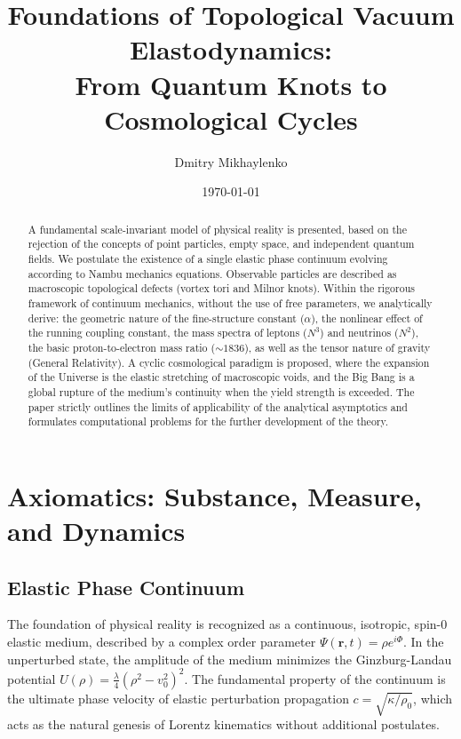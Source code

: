 \documentclass[12pt,a4paper]{article}
\title{\textbf{Foundations of Topological Vacuum Elastodynamics:\\ From Quantum Knots to Cosmological Cycles}}
\author{Dmitry Mikhaylenko}
\date{\today}
\begin{document}
\maketitle

\begin{abstract}
A fundamental scale-invariant model of physical reality is presented, based on the rejection of the concepts of point particles, empty space, and independent quantum fields. We postulate the existence of a single elastic phase continuum evolving according to Nambu mechanics equations. Observable particles are described as macroscopic topological defects (vortex tori and Milnor knots). 
Within the rigorous framework of continuum mechanics, without the use of free parameters, we analytically derive: the geometric nature of the fine-structure constant ($\alpha$), the nonlinear effect of the running coupling constant, the mass spectra of leptons ($N^3$) and neutrinos ($N^2$), the basic proton-to-electron mass ratio ($\sim 1836$), as well as the tensor nature of gravity (General Relativity). A cyclic cosmological paradigm is proposed, where the expansion of the Universe is the elastic stretching of macroscopic voids, and the Big Bang is a global rupture of the medium's continuity when the yield strength is exceeded. The paper strictly outlines the limits of applicability of the analytical asymptotics and formulates computational problems for the further development of the theory.
\end{abstract}

\section{Axiomatics: Substance, Measure, and Dynamics}

\subsection{Elastic Phase Continuum}
The foundation of physical reality is recognized as a continuous, isotropic, spin-0 elastic medium, described by a complex order parameter $\Psi(\mathbf{r}, t) = \rho e^{i\Phi}$. In the unperturbed state, the amplitude of the medium minimizes the Ginzburg-Landau potential $U(\rho) = \frac{\lambda}{4}(\rho^2 - v_0^2)^2$. The fundamental property of the continuum is the ultimate phase velocity of elastic perturbation propagation $c = \sqrt{\kappa / \rho_0}$, which acts as the natural genesis of Lorentz kinematics without additional postulates.
\end{document}
